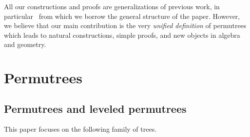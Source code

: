 \documentclass[ALCO]{cedram}
\newcommand{\darkblue}{\color{darkblue}} %
\newcommand{\defn}[1]{\emph{\darkblue #1}} %
\begin{document}
All our constructions and proofs are generalizations of previous work, in particular~\cite{ChatelPilaud} from which we borrow the general structure of the paper. However, we believe that our main contribution is the very \defn{unified definition} of permutrees which leads to natural constructions, simple proofs, and new objects in algebra and geometry. 


\section{Permutrees}
\label{sec:permutrees}


\subsection{Permutrees and leveled permutrees}
\label{subsec:permutrees}

This paper focuses on the following family of trees.
\end{document}

